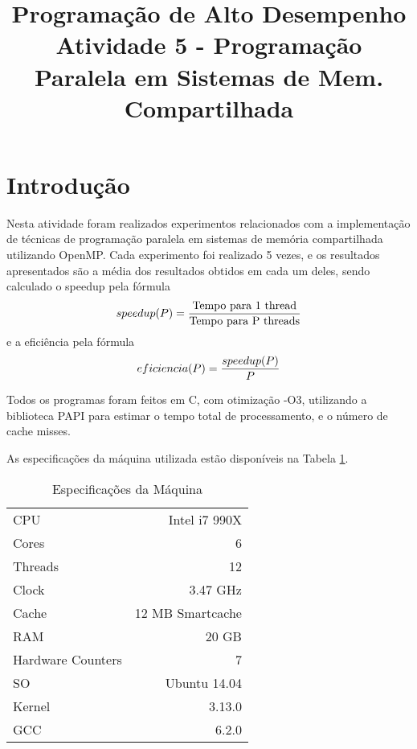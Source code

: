 \documentclass[conference]{IEEEtran}
\begin{document}
\title{Programação de Alto Desempenho\\
\large Atividade 5 - Programação Paralela em Sistemas de Mem. Compartilhada}

\author{
 }

\maketitle


\section{Introdução}
Nesta atividade foram realizados experimentos relacionados com a implementação de técnicas de programação paralela em sistemas de memória compartilhada utilizando OpenMP.
Cada experimento foi realizado 5 vezes, e os resultados apresentados são a média dos resultados obtidos em cada um deles, sendo calculado o speedup pela fórmula $$speedup(P) = {{\textrm{Tempo para 1 thread} }\over{\textrm{Tempo para P threads} }}$$ e a eficiência pela fórmula $$eficiencia(P) = {{speedup(P)}\over{P}}$$

Todos os programas foram feitos em C, com otimização -O3, utilizando a biblioteca PAPI para estimar o tempo total de processamento, e o número de cache misses.


As especificações da máquina utilizada estão disponíveis na Tabela \ref{tab:cpu}.

\begin{table}[htb!]
\centering
\caption{Especificações da Máquina}
\label{tab:cpu}
\begin{tabular}{lr}
CPU & Intel i7 990X \\
Cores & 6\\
Threads & 12\\
Clock & 3.47 GHz\\
Cache& 12 MB Smartcache \\
RAM & 20 GB \\
Hardware Counters & 7 \\
SO & Ubuntu 14.04 \\
Kernel & 3.13.0 \\
GCC &  6.2.0\\
\end{tabular}
\end{table}
\end{document}
